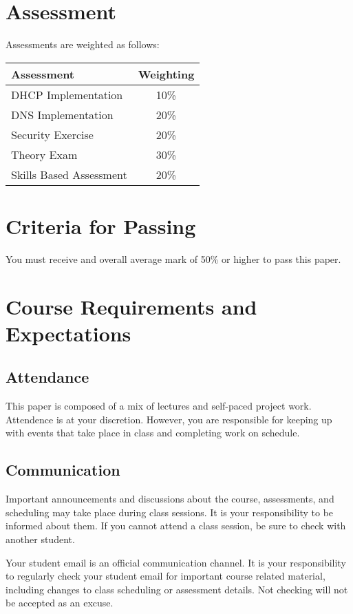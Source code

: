 \documentclass{article}
\begin{document}
\section*{Assessment}

Assessments are weighted as follows: \\
\begin{tabular}{|l|c|}
\hline
Assessment                  &  Weighting \\ \hline
DHCP Implementation         &  10\% \\ \hline
DNS Implementation          &  20\% \\ \hline
Security Exercise           &  20\% \\ \hline
Theory Exam                 &  30\% \\ \hline
Skills Based Assessment     &  20\% \\ \hline
\end{tabular}

\section*{Criteria for Passing}
You must receive and overall average mark of 50\% or higher to pass this paper.

\section*{Course Requirements and Expectations}
\subsection*{Attendance}
This paper is composed of a mix of lectures and self-paced project work.  Attendence is at your discretion. 
However, you are responsible for keeping up with events that take place in class and completing work on schedule. 

\subsection*{Communication}
Important announcements and discussions about the course, assessments, and scheduling may take place during class sessions.  It is your responsibility to be informed about them.  If you cannot attend a class session, be sure to check with another student.

Your student email is an official communication channel. It is your responsibility to regularly check your student email for important course related material, including changes to class scheduling or assessment details. Not checking will not be accepted as an excuse.
\end{document}
